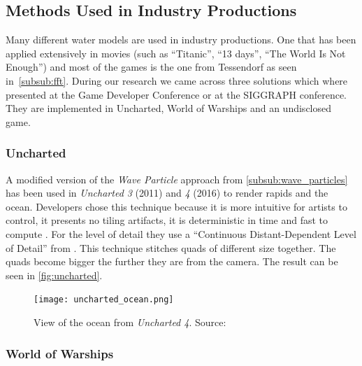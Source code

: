 \subsection{Methods Used in Industry Productions}\label{subsec:methods_industry}


Many different water models are used in industry productions. One that has been
applied extensively in movies (such as ``Titanic'', ``13 days'', ``The World Is
Not Enough'') and most of the games is the one from Tessendorf
\autocite{tessendorf2001simulating} as seen in~\ref{subsub:fft}.  During our
research we came across three solutions which where presented at the Game
Developer Conference or at the SIGGRAPH conference. They are implemented in
Uncharted, World of Warships and an undisclosed game.

\subsubsection{Uncharted}\label{subsub:uncharted}

A modified version of the \textit{Wave Particle} approach from
\autoref{subsub:wave_particles} has been used in \textit{Uncharted 3} (2011) and
\textit{4} (2016) to render rapids and the ocean. Developers chose this
technique because it is more intuitive for artists to control, it presents no
tiling artifacts, it is deterministic in time and fast to compute
\autocite{gonzalez2012water}. For the level of detail they use a ``Continuous
Distant-Dependent Level of Detail'' from \autocite{strugar2009continuous}. This
technique stitches quads of different size together. The quads become bigger the
further they are from the camera. The result can be seen in
\autoref{fig:uncharted}.

\begin{figure}[h]
    \centering
    \texttt{[image: uncharted\_ocean.png]}
    \caption{View of the ocean from \textit{Uncharted 4}. Source:
    \autocite{gonzalez2016rendering}}\label{fig:uncharted}
\end{figure}


\subsubsection{World of Warships}\label{subsub:world_of_warships}

